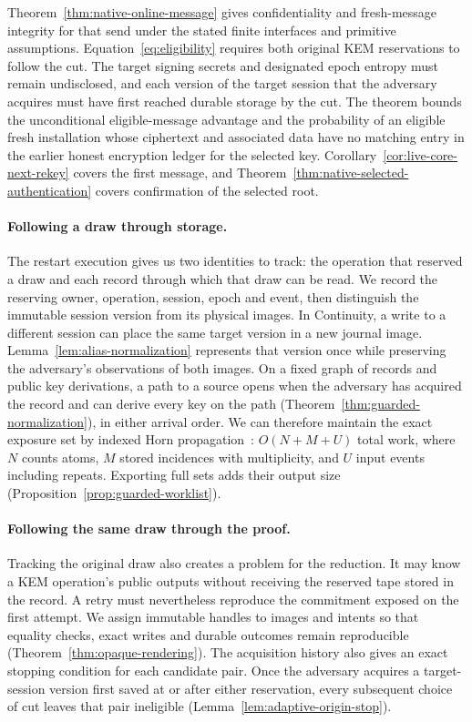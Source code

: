 Theorem~\ref{thm:native-online-message} gives confidentiality and
fresh-message integrity for that send under the stated finite interfaces
and primitive assumptions. Equation~\eqref{eq:eligibility} requires
both original KEM reservations to follow the cut. The target signing
secrets and designated epoch entropy must remain undisclosed, and each
version of the target session that the adversary acquires must have
first reached durable storage by the cut. The theorem bounds the unconditional
eligible-message advantage and the probability of an eligible fresh
installation whose ciphertext and associated data have no matching
entry in the earlier honest encryption ledger for the selected key.
Corollary~\ref{cor:live-core-next-rekey} covers the first
message, and Theorem~\ref{thm:native-selected-authentication} covers
confirmation of the selected root.

\paragraph{Following a draw through storage.}
The restart execution gives us two identities to track: the operation
that reserved a draw and each record through which that draw can be
read. We record the reserving owner, operation, session, epoch and event,
then distinguish the immutable session version from its physical images.
In Continuity, a write to a different session can place the same target
version in a new journal image. Lemma~\ref{lem:alias-normalization}
represents that version once while preserving the adversary's
observations of both images. On a fixed graph of records and public
key derivations, a path to a source opens when the adversary
has acquired the record and can derive every key on the path
(Theorem~\ref{thm:guarded-normalization}), in either arrival order.
We can therefore maintain the exact exposure set by indexed Horn
propagation~\cite{dowlingGallier1984}: $O(N+M+U)$ total work, where
$N$ counts atoms, $M$ stored incidences with multiplicity, and $U$ input
events including repeats. Exporting full sets adds their output size
(Proposition~\ref{prop:guarded-worklist}).

\paragraph{Following the same draw through the proof.}
Tracking the original draw also creates a problem for the reduction.
It may know a KEM operation's public outputs without receiving the
reserved tape stored in the record. A retry must nevertheless
reproduce the commitment exposed on the first attempt. We assign
immutable handles to images and intents so that equality checks, exact
writes and durable outcomes remain reproducible
(Theorem~\ref{thm:opaque-rendering}). The acquisition history also gives
an exact stopping condition for each candidate pair. Once the adversary
acquires a target-session version first saved at or after either
reservation, every subsequent choice of cut leaves that pair ineligible
(Lemma~\ref{lem:adaptive-origin-stop}).

